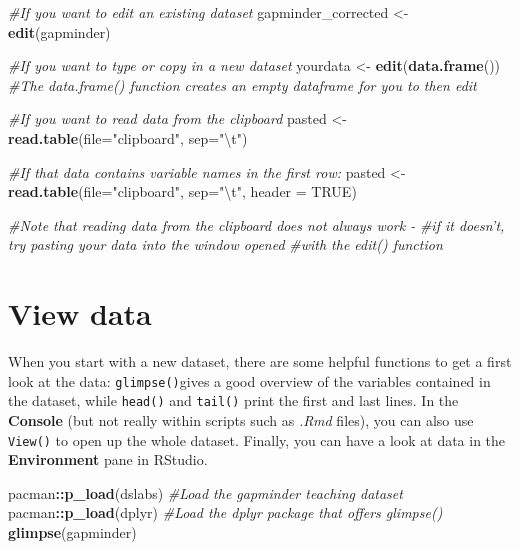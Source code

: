\documentclass[
]{book}
\newenvironment{Shaded}{\begin{snugshade}}{\end{snugshade}}
\newcommand{\CharTok}[1]{\textcolor[rgb]{0.31,0.60,0.02}{#1}}
\newcommand{\CommentTok}[1]{\textcolor[rgb]{0.56,0.35,0.01}{\textit{#1}}}
\newcommand{\DataTypeTok}[1]{\textcolor[rgb]{0.13,0.29,0.53}{#1}}
\newcommand{\KeywordTok}[1]{\textcolor[rgb]{0.13,0.29,0.53}{\textbf{#1}}}
\newcommand{\NormalTok}[1]{#1}
\newcommand{\OperatorTok}[1]{\textcolor[rgb]{0.81,0.36,0.00}{\textbf{#1}}}
\newcommand{\OtherTok}[1]{\textcolor[rgb]{0.56,0.35,0.01}{#1}}
\newcommand{\StringTok}[1]{\textcolor[rgb]{0.31,0.60,0.02}{#1}}
\begin{document}
\begin{Shaded}
\begin{Highlighting}[]
\CommentTok{#If you want to edit an existing dataset}
\NormalTok{gapminder_corrected <-}\StringTok{ }\KeywordTok{edit}\NormalTok{(gapminder)}

\CommentTok{#If you want to type or copy in a new dataset}
\NormalTok{yourdata <-}\StringTok{ }\KeywordTok{edit}\NormalTok{(}\KeywordTok{data.frame}\NormalTok{())}
\CommentTok{#The data.frame() function creates an empty dataframe for you to then edit}

\CommentTok{#If you want to read data from the clipboard}
\NormalTok{pasted <-}\StringTok{ }\KeywordTok{read.table}\NormalTok{(}\DataTypeTok{file=}\StringTok{"clipboard"}\NormalTok{, }\DataTypeTok{sep=}\StringTok{"}\CharTok{\textbackslash{}t}\StringTok{"}\NormalTok{)}

\CommentTok{#If that data contains variable names in the first row:}
\NormalTok{pasted <-}\StringTok{ }\KeywordTok{read.table}\NormalTok{(}\DataTypeTok{file=}\StringTok{"clipboard"}\NormalTok{, }\DataTypeTok{sep=}\StringTok{"}\CharTok{\textbackslash{}t}\StringTok{"}\NormalTok{, }\DataTypeTok{header =} \OtherTok{TRUE}\NormalTok{)}

\CommentTok{#Note that reading data from the clipboard does not always work - }
\CommentTok{#if it doesn't, try pasting your data into the window opened }
\CommentTok{#with the edit() function}
\end{Highlighting}
\end{Shaded}

\hypertarget{view-data}{%
\section{View data}\label{view-data}}

When you start with a new dataset, there are some helpful functions to get a first look at the data: \texttt{glimpse()}gives a good overview of the variables contained in the dataset, while \texttt{head()} and \texttt{tail()} print the first and last lines. In the \textbf{Console} (but not really within scripts such as \emph{.Rmd} files), you can also use \texttt{View()} to open up the whole dataset. Finally, you can have a look at data in the \textbf{Environment} pane in RStudio.

\begin{Shaded}
\begin{Highlighting}[]
\NormalTok{pacman}\OperatorTok{::}\KeywordTok{p_load}\NormalTok{(dslabs) }\CommentTok{#Load the gapminder teaching dataset}
\NormalTok{pacman}\OperatorTok{::}\KeywordTok{p_load}\NormalTok{(dplyr) }\CommentTok{#Load the dplyr package that offers glimpse()}
\KeywordTok{glimpse}\NormalTok{(gapminder)}
\end{Highlighting}
\end{Shaded}
\end{document}
